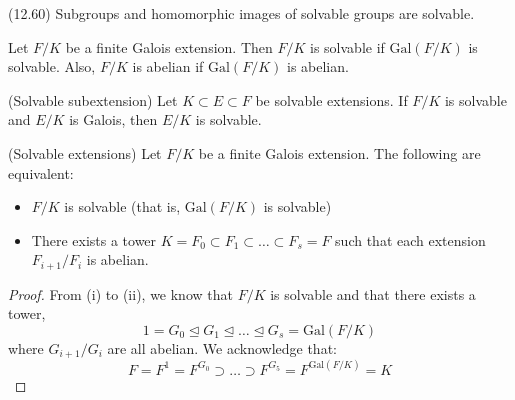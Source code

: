 \begin{prop}
(12.60) Subgroups and homomorphic images of solvable groups are solvable. 
\end{prop}
\vspace{2ex}
\begin{defi}
Let $F/K$ be a finite Galois extension. Then $F/K$ is solvable if $\mathrm{Gal}(F/K)$ is solvable. Also, $F/K$ is abelian if $\mathrm{Gal}(F/K)$ is abelian.
\end{defi}
\vspace{2ex}
\begin{cor}
(Solvable subextension) Let $K\subset E\subset F$ be solvable extensions. If $F/K$ is solvable and $E/K$ is Galois, then $E/K$ is solvable. 
\end{cor}
\vspace{2ex}
\begin{lem}
(Solvable extensions) Let $F/K$ be a finite Galois extension. The following are equivalent:
\begin{itemize}
\item[(i)] $F/K$ is solvable (that is, $\mathrm{Gal}(F/K)$ is solvable)
\item[(ii)] There exists a tower $K=F_0\subset F_1\subset \ldots \subset F_{s}=F$ such that each extension $F_{i+1}/F_{i}$ is abelian.
\end{itemize}
\end{lem}
\vspace{2ex}
\begin{proof}
From (i) to (ii), we know that $F/K$ is solvable and that there exists a tower,
\[1=G_0\trianglelefteq G_1\trianglelefteq \ldots \trianglelefteq G_{s}=\mathrm{Gal}(F/K)\]
where $G_{i+1}/G_{i}$ are all abelian. We acknowledge that:
\[F=F^{1}=F^{G_0}\supset \ldots \supset F^{G_{5}}=F^{\mathrm{Gal}(F/K)}=K\]

\end{proof}
\vspace{2ex}

